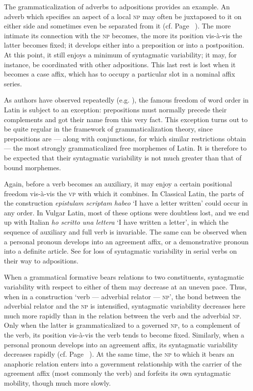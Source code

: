 The grammaticalization of adverbs to adpositions provides an example. An adverb which specifies an aspect of a local \textsc{np} may often be juxtaposed to it on either side and sometimes even be separated from it (cf. Page~\pageref{page96}\chk%
). The more intimate its connection with the \textsc{np} becomes, the more its position vis-à-vis the latter becomes fixed; it develops either into a preposition or into a postposition. At this point, it still enjoys a minimum of syntagmatic variability; it may, for instance, be coordinated with other adpositions. This last rest is lost when it becomes a case affix, which has to occupy a particular slot in a nominal affix series.

As authors have observed repeatedly (e.g. \citealt[256]{Matthews1981}), the famous freedom of word order in Latin is subject to an exception: prepositions must normally precede their complements and got their name from this very fact. This exception turns out to be quite regular in the framework of grammaticalization theory, since prepositions are — along with conjunctions, for which similar restrictions obtain — the most strongly grammaticalized free morphemes of Latin. It is therefore to be expected that their syntagmatic variability is not much greater than that of bound morphemes.

Again, before a verb becomes an auxiliary, it may enjoy a certain positional freedom vis-à-vis the \textsc{vp} with which it combines. In Classical Latin, the parts of the construction \textit{epistulam scriptam habeo} ‘I have a letter written’ could occur in any order. In Vulgar Latin, most of these options were doubtless lost, and we end up with Italian \textit{ho scritto una lettera} ‘I have written a letter’, in which the sequence of auxiliary and full verb is invariable. The same can be observed when a personal pronoun develops into an agreement affix, or a demonstrative pronoun into a definite article. See \citet[84f]{Givón1975} for loss of syntagmatic variability in serial verbs on their way to adpositions.

When a grammatical formative bears relations to two constituents, syntagmatic variability with respect to either of them may decrease at an uneven pace. Thus, when in a construction ‘verb — adverbial relator — \textsc{np}’, the bond between the adverbial relator and the \textsc{np} is intensified, syntagmatic variability decreases here much more rapidly than in the relation between the verb and the adverbial \textsc{np}. Only when the latter is grammaticalized to a governed \textsc{np}, to a complement of the verb, its position vis-à-vis the verb tends to become fixed. Similarly, when a personal pronoun develops into an agreement affix, its syntagmatic variability decreases rapidly (cf. Page~\pageref{page44b}\chk%
). At the same time, the \textsc{np} to which it bears an anaphoric relation enters into a government relationship with the carrier of the agreement affix (most commonly the verb) and forfeits its own syntagmatic mobility, though much more slowly.

